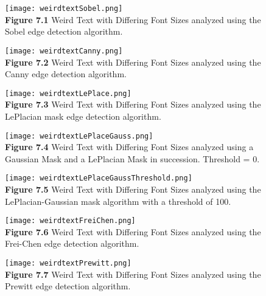\documentclass{article}%
\begin{document}
\newpage
\begin{figure}[h]
\centering
\texttt{[image: weirdtextSobel.png]}\\
{\bf Figure 7.1} Weird Text with Differing Font Sizes analyzed using the Sobel edge detection algorithm.   
\end{figure}

\newpage
\begin{figure}[h]
\centering
\texttt{[image: weirdtextCanny.png]}\\
{\bf Figure 7.2} Weird Text with Differing Font Sizes analyzed using the Canny edge detection algorithm.   
\end{figure}

\newpage
\begin{figure}[h]
\centering
\texttt{[image: weirdtextLePlace.png]}\\
{\bf Figure 7.3} Weird Text with Differing Font Sizes analyzed using the LePlacian mask edge detection algorithm.  
\end{figure}

\newpage
\begin{figure}[h]
\centering
\texttt{[image: weirdtextLePlaceGauss.png]}\\
{\bf Figure 7.4} Weird Text with Differing Font Sizes analyzed using a Gaussian Mask and a LePlacian Mask in succession. Threshold = 0.   
\end{figure}

\newpage
\begin{figure}[h]
\centering
\texttt{[image: weirdtextLePlaceGaussThreshold.png]}\\
{\bf Figure 7.5} Weird Text with Differing Font Sizes analyzed using the LePlacian-Gaussian mask algorithm with a threshold of 100.  
\end{figure}

\newpage
\begin{figure}[h]
\centering
\texttt{[image: weirdtextFreiChen.png]}\\
{\bf Figure 7.6} Weird Text with Differing Font Sizes analyzed using the Frei-Chen edge detection algorithm.  
\end{figure}

\newpage
\begin{figure}[h]
\centering
\texttt{[image: weirdtextPrewitt.png]}\\
{\bf Figure 7.7} Weird Text with Differing Font Sizes analyzed using the Prewitt edge detection algorithm.  
\end{figure}
\end{document}

